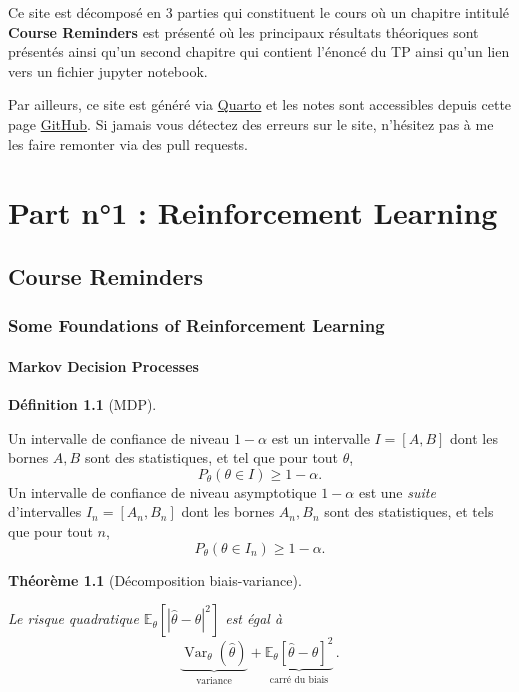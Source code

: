 \documentclass[
  10,
  letterpaper,
  DIV=11,
  numbers=noendperiod]{scrreport}
\theoremstyle{plain}
\newtheorem{theorem}{Théorème}[chapter]
\theoremstyle{definition}
\newtheorem{definition}{Définition}[chapter]
\theoremstyle{definition}
\theoremstyle{remark}
\begin{document}

Ce site est décomposé en 3 parties qui constituent le cours où un
chapitre intitulé \textbf{Course Reminders} est présenté où les
principaux résultats théoriques sont présentés ainsi qu'un second
chapitre qui contient l'énoncé du TP ainsi qu'un lien vers un fichier
jupyter notebook.

Par ailleurs, ce site est généré via \href{https://quarto.org}{Quarto}
et les notes sont accessibles depuis cette page
\href{https://github.com/SamyMekk/TP-Controle-Stochastique}{GitHub}. Si
jamais vous détectez des erreurs sur le site, n'hésitez pas à me les
faire remonter via des pull requests.

\part{Part n°1 : Reinforcement Learning}

\chapter{Course Reminders}\label{course-reminders}

\section{Some Foundations of Reinforcement
Learning}\label{some-foundations-of-reinforcement-learning}

\subsection{Markov Decision Processes}\label{markov-decision-processes}

\begin{definition}[MDP]\protect\hypertarget{def-MDP}{}\label{def-MDP}

Un intervalle de confiance de niveau \(1-\alpha\) est un intervalle
\(I = [A,B]\) dont les bornes \(A,B\) sont des statistiques, et tel que
pour tout \(\theta\), \[P_\theta(\theta \in I) \geqslant 1 - \alpha.\]
Un intervalle de confiance de niveau asymptotique \(1-\alpha\) est une
\emph{suite} d'intervalles \(I_n = [A_n,B_n]\) dont les bornes
\(A_n,B_n\) sont des statistiques, et tels que pour tout \(n\),
\[ P_\theta(\theta \in I_n) \geqslant 1 - \alpha.\]

\end{definition}

\begin{theorem}[Décomposition
biais-variance]\protect\hypertarget{thm-biaisvar}{}\label{thm-biaisvar}

Le risque quadratique \(\mathbb{E}_{\theta} [|\hat{\theta}-\theta|^2]\)
est égal à \[
\underbrace{\operatorname{Var}_{\theta} (\hat{\theta})}_{\text{variance}} +
\underbrace{\mathbb{E}_{\theta}[\hat{\theta}-\theta]^2}_{\text{carré du biais}} \, .
\]

\end{theorem}
\end{document}
